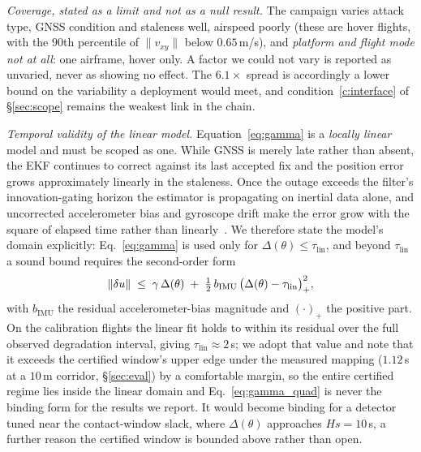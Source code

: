 \emph{Coverage, stated as a limit and not as a null result.} The campaign varies
attack type, GNSS condition and staleness well, airspeed poorly (these are hover
flights, with the $90$th percentile of $\lVert v_{xy}\rVert$ below $0.65$\,m/s),
and \emph{platform and flight mode not at all}: one airframe, hover only. A
factor we could not vary is reported as unvaried, never as showing no effect.
The $6.1\times$ spread is accordingly a lower bound on the variability a
deployment would meet, and condition~\ref{c:interface} of \S\ref{sec:scope}
remains the weakest link in the chain.

\emph{Temporal validity of the linear model.} Equation~\eqref{eq:gamma} is a
\emph{locally linear} model and must be scoped as one. While GNSS is merely
late rather than absent, the EKF continues to correct against its last accepted
fix and the position error grows approximately linearly in the staleness. Once
the outage exceeds the filter's innovation-gating horizon the estimator is
propagating on inertial data alone, and uncorrected accelerometer bias and
gyroscope drift make the error grow with the square of elapsed time rather than
linearly~\cite{kong2024px4ekf}. We therefore state the model's domain
explicitly: Eq.~\eqref{eq:gamma} is used only for
$\Delta(\theta)\le\tau_{\mathrm{lin}}$, and beyond $\tau_{\mathrm{lin}}$ a
sound bound requires the second-order form
\begin{equation}
\label{eq:gamma_quad}
\left\lVert \delta u\right\rVert\;\le\;\gamma\,\Delta(\theta)\;+\;\tfrac12\,b_{\mathrm{IMU}}\,\big(\Delta(\theta)-\tau_{\mathrm{lin}}\big)_{+}^{2},
\end{equation}
with $b_{\mathrm{IMU}}$ the residual accelerometer-bias magnitude and
$(\cdot)_+$ the positive part. On the calibration flights the linear fit holds
to within its residual over the full observed degradation interval, giving
$\tau_{\mathrm{lin}}\approx2$\,s; we adopt that value and note that it
exceeds the certified window's upper edge under the measured mapping
($1.12$\,s at a $10$\,m corridor, \S\ref{sec:eval}) by a comfortable margin,
so the entire certified regime lies inside the linear domain and
Eq.~\eqref{eq:gamma_quad} is never the binding form for the results we report. It
would become binding for a detector tuned near the contact-window slack, where
$\Delta(\theta)$ approaches $Hs=10$\,s, a further reason the certified window
is bounded above rather than open.

\begin{table}[t]
\centering
\caption{The measured delay-to-position rate $\gamma$, from three real PX4
flights (one benign reference, one GPS-jamming, one GPS-spoofing) in the
, self-referenced to the pre-attack median. ``noise''
is the pre-attack position-error $95$th percentile; $\gamma_{\mathrm{lsq}}$ and
$\gamma_{\mathrm{peak}}$ are the least-squares and peak-secant growth rates
after attack onset. These are the  pairings.}
\label{tab:whelan}
\scriptsize
\renewcommand{\arraystretch}{1.1}

\end{table}

